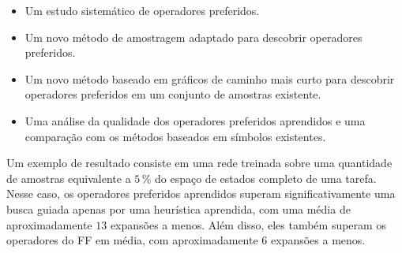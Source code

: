 \documentclass[ppgc,diss,english]{iiufrgs}
\begin{document}
\begin{itemize}
\item Um estudo sistemático de operadores preferidos.
\item Um novo método de amostragem adaptado para descobrir operadores preferidos.
\item Um novo método baseado em gráficos de caminho mais curto para descobrir operadores preferidos em um conjunto de amostras existente.
\item Uma análise da qualidade dos operadores preferidos aprendidos e uma comparação com os métodos baseados em símbolos existentes.
\end{itemize}

Um exemplo de resultado consiste em uma rede treinada sobre uma quantidade de amostras equivalente a $5\,\%$ do espaço de estados completo de uma tarefa. Nesse caso, os operadores preferidos aprendidos superam significativamente uma busca guiada apenas por uma heurística aprendida, com uma média de aproximadamente $13$ expansões a menos. Além disso, eles também superam os operadores do FF em média, com aproximadamente $6$ expansões a menos.
\end{document}
